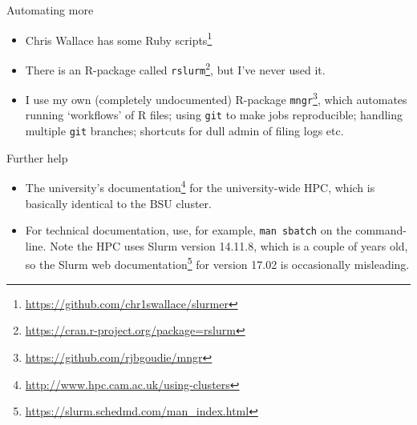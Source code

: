\documentclass[t,10pt]{beamer}
\let\oldfootnote\footnote
\renewcommand\footnote[1][]{\oldfootnote[frame,#1]}
\begin{document}
\begin{frame}[fragile]{Automating more}

\begin{itemize}
\item Chris Wallace has some Ruby scripts\footnote{\url{https://github.com/chr1swallace/slurmer}}

\item There is an R-package called \texttt{rslurm}\footnote{\url{https://cran.r-project.org/package=rslurm}}, but I've never used it.

\item I use my own (completely undocumented) R-package \texttt{mngr}\footnote{\url{https://github.com/rjbgoudie/mngr}}, which automates running `workflows' of R files; using \verb|git| to make jobs reproducible; handling multiple \verb|git| branches; shortcuts for dull admin of filing logs etc.
\end{itemize}

\end{frame}

\begin{frame}{Further help}

\begin{itemize}
\item The university's documentation\footnote{\url{http://www.hpc.cam.ac.uk/using-clusters}} for the university-wide HPC, which is basically identical to the BSU cluster.

\item For technical documentation, use, for example, \texttt{man sbatch} on the command-line. Note the HPC uses Slurm version 14.11.8, which is a couple of years old, so the Slurm web documentation\footnote{\url{https://slurm.schedmd.com/man_index.html}} for version 17.02 is occasionally misleading.
\end{itemize}

\end{frame}
\end{document}
